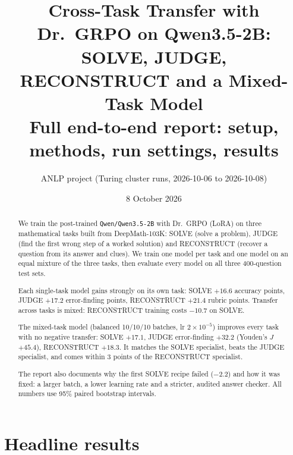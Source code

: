 \documentclass[10pt,a4paper]{article}
\title{Cross-Task Transfer with Dr.~GRPO on Qwen3.5-2B:\\
SOLVE, JUDGE, RECONSTRUCT and a Mixed-Task Model\\[4pt]
\large Full end-to-end report: setup, methods, run settings, results}
\author{ANLP project (Turing cluster runs, 2026-10-06 to 2026-10-08)}
\date{8 October 2026}
\begin{document}
\maketitle

\begin{abstract}
We train the post-trained \texttt{Qwen/Qwen3.5-2B} with Dr.~GRPO (LoRA) on three mathematical tasks built from
DeepMath-103K: SOLVE (solve a problem), JUDGE (find the first wrong step of a worked solution) and RECONSTRUCT (recover
a question from its answer and clues). We train one model per task and one model on an equal mixture of the three
tasks, then evaluate every model on all three 400-question test sets.

Each single-task model gains strongly on its own task: SOLVE $+16.6$ accuracy points, JUDGE $+17.2$ error-finding
points, RECONSTRUCT $+21.4$ rubric points. Transfer across tasks is mixed: RECONSTRUCT training costs $-10.7$ on
SOLVE.

The mixed-task model (balanced 10/10/10 batches, lr $2\times10^{-5}$) improves every task with no negative transfer:
SOLVE $+17.1$, JUDGE error-finding $+32.2$ (Youden's $J$ $+45.4$), RECONSTRUCT $+18.3$. It matches the SOLVE
specialist, beats the JUDGE specialist, and comes within 3 points of the RECONSTRUCT specialist.

The report also documents why the first SOLVE recipe failed ($-2.2$) and how it was fixed: a larger batch, a lower
learning rate and a stricter, audited answer checker. All numbers use 95\% paired bootstrap intervals.
\end{abstract}

\tableofcontents
\newpage

\section{Headline results}
\end{document}
